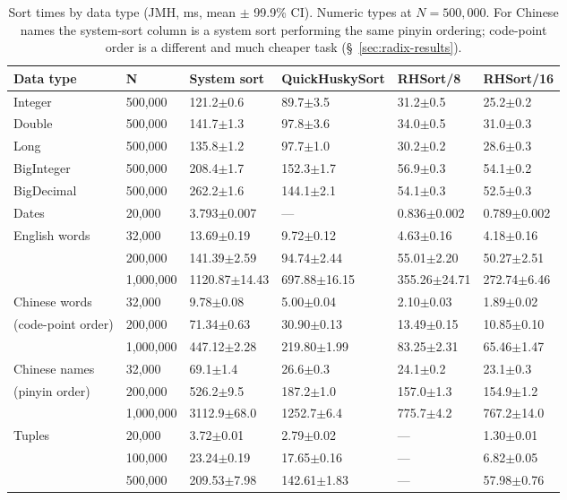 \documentclass[twoside,leqno,twocolumn]{article}
\begin{document}
\begin{table}
  \caption{Sort times by data type (JMH, ms, mean $\pm$ 99.9\% CI). Numeric types at $N=500{,}000$.
    For Chinese names the system-sort column is a system sort performing the same pinyin ordering;
    code-point order is a different and much cheaper task (\S~\ref{sec:radix-results}).}
  \label{tab:HS_BM}
  \centering
  \begin{tabular}{llllll}
    \toprule
    Data type & N & System sort & QuickHuskySort & RHSort/8 & RHSort/16 \\
    \midrule
    Integer & 500,000 & 121.2$\pm$0.6 & 89.7$\pm$3.5 & 31.2$\pm$0.5 & 25.2$\pm$0.2 \\
    Double & 500,000 & 141.7$\pm$1.3 & 97.8$\pm$3.6 & 34.0$\pm$0.5 & 31.0$\pm$0.3 \\
    Long & 500,000 & 135.8$\pm$1.2 & 97.7$\pm$1.0 & 30.2$\pm$0.2 & 28.6$\pm$0.3 \\
    BigInteger & 500,000 & 208.4$\pm$1.7 & 152.3$\pm$1.7 & 56.9$\pm$0.3 & 54.1$\pm$0.2 \\
    BigDecimal & 500,000 & 262.2$\pm$1.6 & 144.1$\pm$2.1 & 54.1$\pm$0.3 & 52.5$\pm$0.3 \\
    Dates & 20,000 & 3.793$\pm$0.007 & --- & 0.836$\pm$0.002 & 0.789$\pm$0.002 \\
    English words & 32,000 & 13.69$\pm$0.19 & 9.72$\pm$0.12 & 4.63$\pm$0.16 & 4.18$\pm$0.16 \\
    & 200,000 & 141.39$\pm$2.59 & 94.74$\pm$2.44 & 55.01$\pm$2.20 & 50.27$\pm$2.51 \\
    & 1,000,000 & 1120.87$\pm$14.43 & 697.88$\pm$16.15 & 355.26$\pm$24.71 & 272.74$\pm$6.46 \\
    Chinese words & 32,000 & 9.78$\pm$0.08 & 5.00$\pm$0.04 & 2.10$\pm$0.03 & 1.89$\pm$0.02 \\
    (code-point order) & 200,000 & 71.34$\pm$0.63 & 30.90$\pm$0.13 & 13.49$\pm$0.15 & 10.85$\pm$0.10 \\
    & 1,000,000 & 447.12$\pm$2.28 & 219.80$\pm$1.99 & 83.25$\pm$2.31 & 65.46$\pm$1.47 \\
    Chinese names & 32,000 & 69.1$\pm$1.4 & 26.6$\pm$0.3 & 24.1$\pm$0.2 & 23.1$\pm$0.3 \\
    (pinyin order) & 200,000 & 526.2$\pm$9.5 & 187.2$\pm$1.0 & 157.0$\pm$1.3 & 154.9$\pm$1.2 \\
    & 1,000,000 & 3112.9$\pm$68.0 & 1252.7$\pm$6.4 & 775.7$\pm$4.2 & 767.2$\pm$14.0 \\
    Tuples & 20,000 & 3.72$\pm$0.01 & 2.79$\pm$0.02 & --- & 1.30$\pm$0.01 \\
    & 100,000 & 23.24$\pm$0.19 & 17.65$\pm$0.16 & --- & 6.82$\pm$0.05 \\
    & 500,000 & 209.53$\pm$7.98 & 142.61$\pm$1.83 & --- & 57.98$\pm$0.76 \\
    \bottomrule
  \end{tabular}
\end{table}
\end{document}
